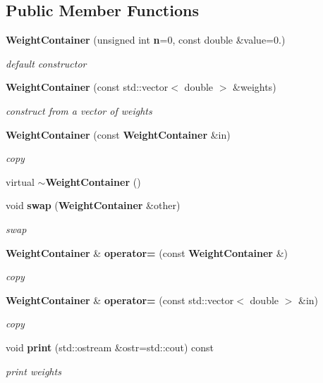 \subsection*{Public Member Functions}
\begin{CompactItemize}
\item 
{\bf Weight\-Container} (unsigned int {\bf n}=0, const double \&value=0.)
\begin{CompactList}\small\item\em default constructor \item\end{CompactList}\item 
{\bf Weight\-Container} (const std::vector$<$ double $>$ \&weights)
\begin{CompactList}\small\item\em construct from a vector of weights \item\end{CompactList}\item 
{\bf Weight\-Container} (const {\bf Weight\-Container} \&in)
\begin{CompactList}\small\item\em copy \item\end{CompactList}\item 
virtual {\bf $\sim$Weight\-Container} ()
\item 
void {\bf swap} ({\bf Weight\-Container} \&other)
\begin{CompactList}\small\item\em swap \item\end{CompactList}\item 
{\bf Weight\-Container} \& {\bf operator=} (const {\bf Weight\-Container} \&)
\begin{CompactList}\small\item\em copy \item\end{CompactList}\item 
{\bf Weight\-Container} \& {\bf operator=} (const std::vector$<$ double $>$ \&in)
\begin{CompactList}\small\item\em copy \item\end{CompactList}\item 
void {\bf print} (std::ostream \&ostr=std::cout) const
\begin{CompactList}\small\item\em print weights \item\end{CompactList}\item 

\end{CompactItemize}
